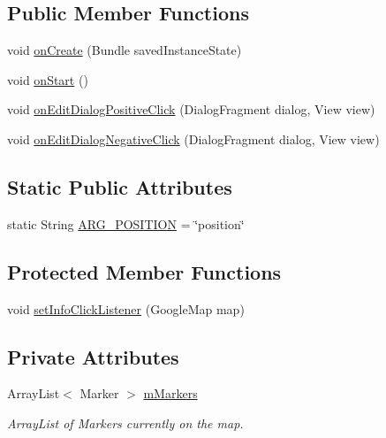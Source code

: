 \subsection*{Public Member Functions}
\begin{DoxyCompactItemize}
\item 
void \hyperlink{classuk_1_1ac_1_1swan_1_1digitaltrails_1_1fragments_1_1_add_waypoint_map_fragment_a962cf9a96da959078697e6c5c4298d67}{on\+Create} (Bundle saved\+Instance\+State)
\item 
void \hyperlink{classuk_1_1ac_1_1swan_1_1digitaltrails_1_1fragments_1_1_add_waypoint_map_fragment_aac9af58bd96b52b532c614987267a07f}{on\+Start} ()
\item 
void \hyperlink{classuk_1_1ac_1_1swan_1_1digitaltrails_1_1fragments_1_1_add_waypoint_map_fragment_a510b75748b076b65fa40024960699386}{on\+Edit\+Dialog\+Positive\+Click} (Dialog\+Fragment dialog, View view)
\item 
void \hyperlink{classuk_1_1ac_1_1swan_1_1digitaltrails_1_1fragments_1_1_add_waypoint_map_fragment_ab8063bca912b6a3172052733064a5749}{on\+Edit\+Dialog\+Negative\+Click} (Dialog\+Fragment dialog, View view)
\end{DoxyCompactItemize}
\subsection*{Static Public Attributes}
\begin{DoxyCompactItemize}
\item 
static String \hyperlink{classuk_1_1ac_1_1swan_1_1digitaltrails_1_1fragments_1_1_add_waypoint_map_fragment_a1546ba6c384f1a7d77c5146d42368d0a}{A\+R\+G\+\_\+\+P\+O\+S\+I\+T\+I\+O\+N} = \char`\"{}position\char`\"{}
\end{DoxyCompactItemize}
\subsection*{Protected Member Functions}
\begin{DoxyCompactItemize}
\item 
void \hyperlink{classuk_1_1ac_1_1swan_1_1digitaltrails_1_1fragments_1_1_add_waypoint_map_fragment_a140a606e633bd54be66aa0e554ec0f95}{set\+Info\+Click\+Listener} (Google\+Map map)
\end{DoxyCompactItemize}
\subsection*{Private Attributes}
\begin{DoxyCompactItemize}
\item 
Array\+List$<$ Marker $>$ \hyperlink{classuk_1_1ac_1_1swan_1_1digitaltrails_1_1fragments_1_1_add_waypoint_map_fragment_a613eb88a3337be436348415c671521c7}{m\+Markers}
\begin{DoxyCompactList}\small\item\em Array\+List of Markers currently on the map. \end{DoxyCompactList}\end{DoxyCompactItemize}
